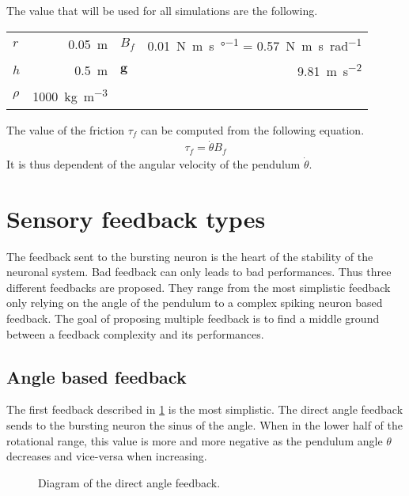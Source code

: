 The value that will be used for all simulations are the following.
{

\large\centering
\begin{tabular}{lr|lr}
    $r$     & \qty{0.05}{\meter}                  & $B_f$    & \qty{0.01}{\newton\meter\second\per\degree} = \qty{0.57}{\newton\meter\second\per\radian}\\
    $h$     & \qty{0.5}{\meter}                   & $\mathbf{g}$    & \qty{9.81}{\meter\per\second\squared}\\
    $\rho$  & \qty{1000}{\kg\per\cubic\meter}     &               & \\
\end{tabular}

}

The value of the friction $\tau_f$ can be computed from the following equation.
\begin{align}
    \tau_f = \dot{\theta}B_f
\end{align}
It is thus dependent of the angular velocity of the pendulum $\dot{\theta}$.

\section{Sensory feedback types}

The feedback sent to the bursting neuron is the heart of the stability of the neuronal system. 
Bad feedback can only leads to bad performances.
Thus three different feedbacks are proposed.
They range from the most simplistic feedback only relying on the angle of the pendulum to a complex spiking neuron based feedback. 
The goal of proposing multiple feedback is to find a middle ground between a feedback complexity and its performances. 

\subsection{Angle based feedback}

The first feedback described in \cref{fig:direct_angle} is the most simplistic.
The direct angle feedback sends to the bursting neuron the sinus of the angle. 
When in the lower half of the rotational range, this value is more and more negative as the pendulum angle $\theta$ decreases and vice-versa when increasing. 

\begin{figure}[!htb]
    \centering
    \caption{Diagram of the direct angle feedback.}
    \label{fig:direct_angle}
\end{figure}

